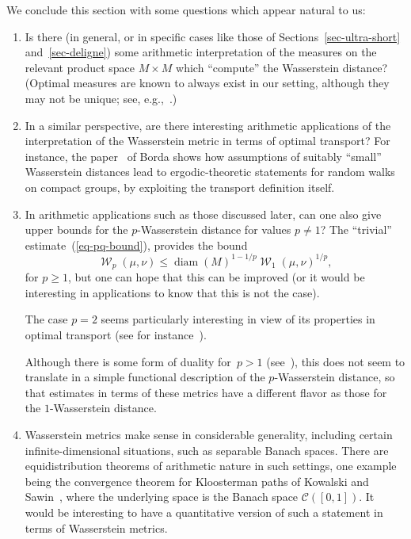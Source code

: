 \documentclass[12pt]{amsart}
\renewcommand{\mathcal}{\mathscr}
\renewcommand{\leq}{\leqslant}
\renewcommand{\geq}{\geqslant}
\DeclareMathOperator{\diam}{diam}
\DeclareMathOperator{\wass}{\mathcal{W}}
\theoremstyle{plain}
\theoremstyle{remark}
\theoremstyle{definition}
\renewcommand{\geq}{\geqslant}
\renewcommand{\leq}{\leqslant}
\begin{document}
We conclude this section with some questions which appear natural to us:
\begin{enumerate}
\item Is there (in general, or in specific cases like those of
  Sections~\ref{sec-ultra-short} and~\ref{sec-deligne}) some arithmetic
  interpretation of the measures on the relevant product space
  $M\times M$ which ``compute'' the Wasserstein distance? (Optimal
  measures are known to always exist in our setting, although they may
  not be unique; see, e.g.,~\cite[Th.\,1.3]{villani}.)
\item In a similar perspective, are there interesting arithmetic
  applications of the interpretation of the Wasserstein metric in
  terms of optimal transport?  For instance, the
  paper~\cite{borda_bernoulli} of Borda shows how assumptions of
  suitably ``small'' Wasserstein distances lead to ergodic-theoretic
  statements for random walks on compact groups, by exploiting the
  transport definition itself.
\item In arithmetic applications such as those discussed later, can one
  also give upper bounds for the $p$-Wasserstein distance for values
  $p\not=1$? The ``trivial'' estimate~(\ref{eq-pq-bound}),
  provides the bound
  \[
    \wass_p(\mu,\nu)\leq \diam(M)^{1-1/p}\wass_1(\mu,\nu)^{1/p},
  \]
  for $p\geq 1$, but one can hope that this can be improved (or it would
  be interesting in applications to know that this is not the case).
  
  The case $p=2$ seems particularly interesting in view of its
  properties in optimal transport (see for
  instance~\cite[Ch.\,2,\,8]{villani}).

  Although there is some form of duality for~$p>1$
  (see~\cite[Th.\,1.3]{villani}), this does not seem to translate in a
  simple functional description of the $p$-Wasserstein distance, so that
  estimates in terms of these metrics have a different flavor as those
  for the $1$-Wasserstein distance.
\item Wasserstein metrics make sense in considerable generality,
  including certain infinite-dimensional situations, such as separable
  Banach spaces. There are equidistribution theorems of arithmetic
  nature in such settings, one example being the convergence theorem
  for Kloosterman paths of Kowalski and Sawin~\cite{kloospaths}, where
  the underlying space is the Banach space $\mathcal{C}([0,1])$. It
  would be interesting to have a quantitative version of such a
  statement in terms of Wasserstein metrics.
\end{enumerate}
\end{document}
